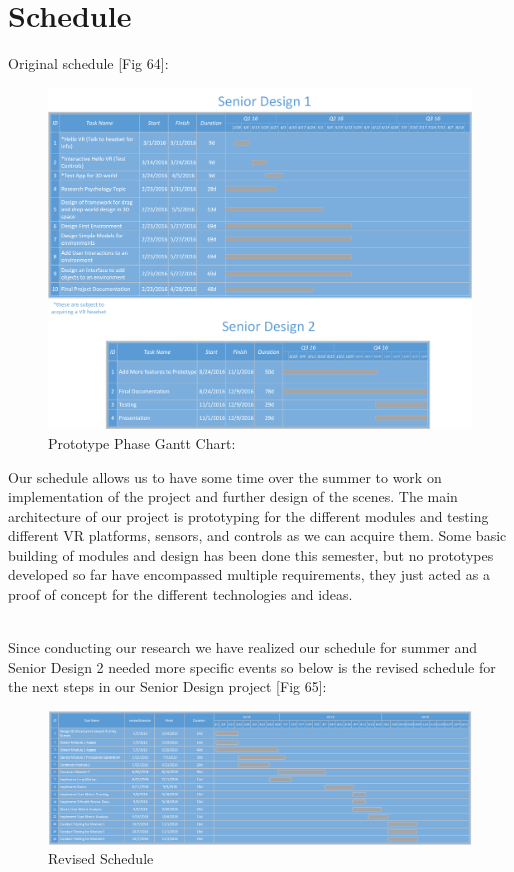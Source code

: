 \documentclass[a4paper,10pt]{article}
\begin{document}
	\section{Schedule}
	Original schedule [Fig 64]:
	\begin{figure}[H]
	\includegraphics[width=\linewidth]{scheduleSR.png}
	\caption{Prototype Phase Gantt Chart:}
	\label{fig:pchart}
	\end{figure}
	\pagebreak
	
	Our schedule allows us to have some time over the summer to work on implementation of the project and further design of the scenes. The main architecture of our project is
	prototyping for the different modules and testing different VR platforms, sensors, and controls as we can acquire them. Some basic building of modules and design has been done
	this semester, but no prototypes developed so far have encompassed multiple requirements, they just acted as a proof of concept for the different technologies and ideas.
	\par~\\
	Since conducting our research we have realized our schedule for summer and Senior Design 2 needed more specific events so below is the revised schedule for the next steps in our Senior Design project [Fig 65]:
	
	\begin{figure}[H]
		\centerline{\includegraphics[scale=0.42, angle=90]{revisedSchedule.png}}
		\caption{Revised Schedule}
		\label{fig:revisedSchedule}
	\end{figure}
	
\end{document}
